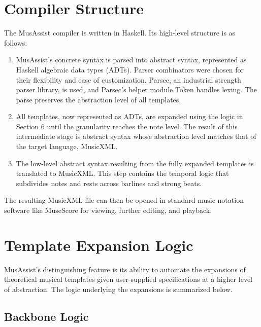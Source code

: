 \documentclass{article}
\begin{document}
\section{Compiler Structure}\label{sec:compiler_structure}

The MusAssist compiler is written in Haskell. Its high-level structure is as follows: 

\begin{enumerate}
\itemsep0pt 
  \item MusAssist’s concrete syntax is parsed into abstract syntax, represented as Haskell algebraic data types (ADTs). Parser combinators were chosen for their flexibility and ease of customization. Parsec, an industrial strength parser library, is used, and Parsec’s helper module Token handles lexing. The parse preserves the abstraction level of all templates.

  \item All templates, now represented as ADTs, are expanded using the logic in Section 6 until the granularity reaches the note level. The result of this intermediate stage is abstract syntax whose abstraction level matches that of the target language, MusicXML.

  \item The low-level abstract syntax resulting from the fully expanded templates is translated to MusicXML. This step contains the temporal logic that subdivides notes and rests across barlines and strong beats.
  
\end{enumerate}

The resulting MusicXML file can then be opened in standard music notation software like MuseScore for viewing, further editing, and playback.


\section{Template Expansion Logic}\label{sec:template_expansions}
MusAssist’s distinguishing feature is its ability to automate the expansions of theoretical musical templates given user-supplied specifications at a higher level of abstraction. The logic underlying the expansions is summarized below. 

\subsection{Backbone Logic}
\end{document}
